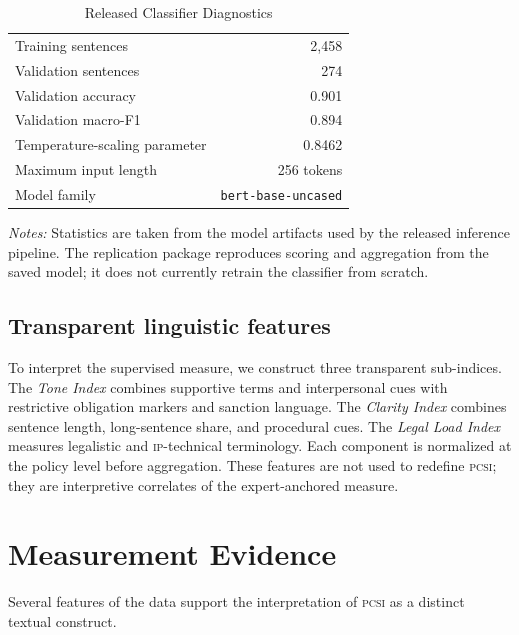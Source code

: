 \documentclass[12pt]{article}
\newcommand{\PCSI}{\textsc{pcsi}}
\newcommand{\IP}{\textsc{ip}}
\begin{document}
\begin{table}[H]
\centering
\caption{Released Classifier Diagnostics}
\label{tab:model}
\begin{threeparttable}
\small
\begin{tabular}{lr}
\toprule
Training sentences & 2,458\\
Validation sentences & 274\\
Validation accuracy & 0.901\\
Validation macro-F1 & 0.894\\
Temperature-scaling parameter & 0.8462\\
Maximum input length & 256 tokens\\
Model family & \texttt{bert-base-uncased}\\
\bottomrule
\end{tabular}
\begin{tablenotes}\footnotesize
\item \textit{Notes:} Statistics are taken from the model artifacts used by the released inference pipeline. The replication package reproduces scoring and aggregation from the saved model; it does not currently retrain the classifier from scratch.
\end{tablenotes}
\end{threeparttable}
\end{table}

\subsection{Transparent linguistic features}

To interpret the supervised measure, we construct three transparent sub-indices. The \emph{Tone Index} combines supportive terms and interpersonal cues with restrictive obligation markers and sanction language. The \emph{Clarity Index} combines sentence length, long-sentence share, and procedural cues. The \emph{Legal Load Index} measures legalistic and \IP{}-technical terminology. Each component is normalized at the policy level before aggregation. These features are not used to redefine \PCSI{}; they are interpretive correlates of the expert-anchored measure.

\section{Measurement Evidence}

Several features of the data support the interpretation of \PCSI{} as a distinct textual construct.
\end{document}
